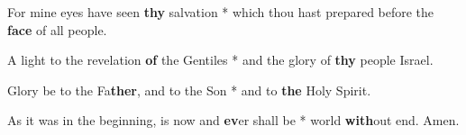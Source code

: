 \begin{multicols}{2}
	For mine eyes have seen \textbf{thy} salvation * which thou hast prepared before the \textbf{face} of all people.
%

	A light to the revelation \textbf{of} the Gentiles * and the glory of \textbf{thy} people Israel.
	
	Glory be to the Fa\textbf{ther}, and to the Son * and to \textbf{the} Holy Spirit.
	
	As it was in the beginning, is now and \textbf{ev}er shall be * world \textbf{with}out end. Amen.
\end{multicols}